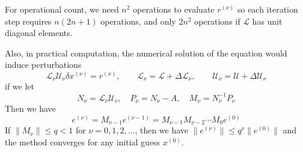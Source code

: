 \documentclass[../main.tex]{subfiles}
\begin{document}
For operational count, we need $n^2$ operations to evaluate $r^{(\nu)}$ so each iteration step requires $n(2n+1)$ operations, and only $2n^2$ operations if $\mathcal{L}$ has unit diagonal elements.

Also, in practical computation, the numerical solution of the equation would induce perturbations
\begin{equation*}
	\mathcal{L}_{\nu} \mathcal{U}_{\nu} \delta x^{(\nu)} = r^{(\nu)}, \qquad \mathcal{L}_{\nu} = \mathcal{L} + \Delta \mathcal{L}_{\nu}, \qquad \mathcal{U}_{\nu} = \mathcal{U} + \Delta \mathcal{U}_{\nu}
\end{equation*}
if we let
\begin{equation*}
	N_{\nu} = \mathcal{L}_{\nu} \mathcal{U}_{\nu}, \quad P_{\nu} = N_{\nu} - A, \quad M_{\nu} = N_{\nu}^{-1} P_{\nu}
\end{equation*}
Then we have
\begin{equation*}
	e^{(\nu)} = M_{\nu-1} e^{(\nu-1)} = M_{\nu-1} M_{\nu-2} \cdots M_0 e^{(0)}
\end{equation*}
If $\| M_{\nu} \| \leq q < 1$ for $\nu = 0, 1, 2, \ldots$, then we have $\| e^{(\nu)} \| \leq q^{\nu} \| e^{(0)} \|$ and the method converges for any initial guess $x^{(0)}$.
\end{document}

